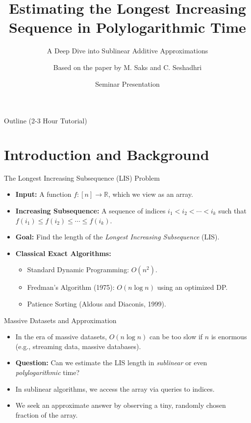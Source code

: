 \documentclass[11pt,aspectratio=169]{beamer}
\title[Estimating LIS in Polylog Time]{Estimating the Longest Increasing Sequence in Polylogarithmic Time}
\subtitle{A Deep Dive into Sublinear Additive Approximations}
\author{Based on the paper by M. Saks and C. Seshadhri}
\date{Seminar Presentation}
\begin{document}
\begin{frame}
    \titlepage
\end{frame}

\begin{frame}{Outline (2-3 Hour Tutorial)}
    \tableofcontents[hideallsubsections]
\end{frame}

\section{Introduction and Background}

\begin{frame}{The Longest Increasing Subsequence (LIS) Problem}
    \begin{itemize}
        \item \textbf{Input:} A function $f:[n] \rightarrow \mathbb{R}$, which we view as an array.
        \item \textbf{Increasing Subsequence:} A sequence of indices $i_1 < i_2 < \cdots < i_k$ such that $f(i_1) \leq f(i_2) \leq \cdots \leq f(i_k)$.
        \item \textbf{Goal:} Find the length of the \emph{Longest Increasing Subsequence} (LIS).
        \pause
        \item \textbf{Classical Exact Algorithms:}
        \begin{itemize}
            \item Standard Dynamic Programming: $O(n^2)$.
            \item Fredman's Algorithm (1975): $O(n \log n)$ using an optimized DP.
            \item Patience Sorting (Aldous and Diaconis, 1999).
        \end{itemize}
    \end{itemize}
\end{frame}

\begin{frame}{Massive Datasets and Approximation}
    \begin{itemize}
        \item In the era of massive datasets, $O(n \log n)$ can be too slow if $n$ is enormous (e.g., streaming data, massive databases).
        \item \textbf{Question:} Can we estimate the LIS length in \emph{sublinear} or even \emph{polylogarithmic} time?
        \pause
        \item In sublinear algorithms, we access the array via queries to indices.
        \item We seek an approximate answer by observing a tiny, randomly chosen fraction of the array.
    \end{itemize}
\end{frame}
\end{document}
